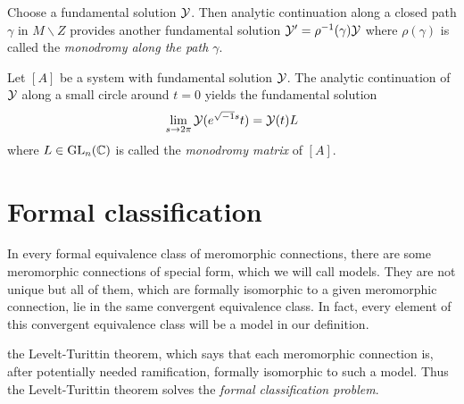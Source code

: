 Choose a fundamental solution $\mathcal{Y}$. Then analytic continuation along a closed
path $\gamma$ in $M\backslash Z$ provides another fundamental solution
$\mathcal{Y}'=\rho^{-1}(\gamma)\mathcal{Y}$ where $\rho(\gamma)$ is called the \emph{monodromy
along the path $\gamma$}.
\begin{defn}
  Let $[A]$ be a system with fundamental solution $\mathcal{Y}$.
  The analytic continuation of $\mathcal{Y}$ along a small circle around $t=0$ yields
  the fundamental solution
  \[
    \lim_{s\to2\pi}\mathcal{Y}(e^{\sqrt{-1}s}t)=\mathcal{Y}(t)L
  \]
  where $L\in\operatorname{GL}_n(\mathbb{C})$ is called the \emph{\TODO[(formal)?]monodromy matrix}
  of $[A]$.
\end{defn}

 

\section{Formal classification}\label{sec:formalClassification}
In every formal equivalence class of meromorphic connections, there are some
meromorphic connections of special form, which we will call models. They are
not unique but all of them, which are formally isomorphic to a given
meromorphic connection, lie in the same convergent equivalence class.
In fact, every element of this convergent equivalence class will be a model in
our definition.

 the Levelt-Turittin theorem, which says
that each meromorphic connection is, after potentially needed ramification,
formally isomorphic to such a model.
Thus the Levelt-Turittin theorem solves the \emph{formal classification
problem}.

